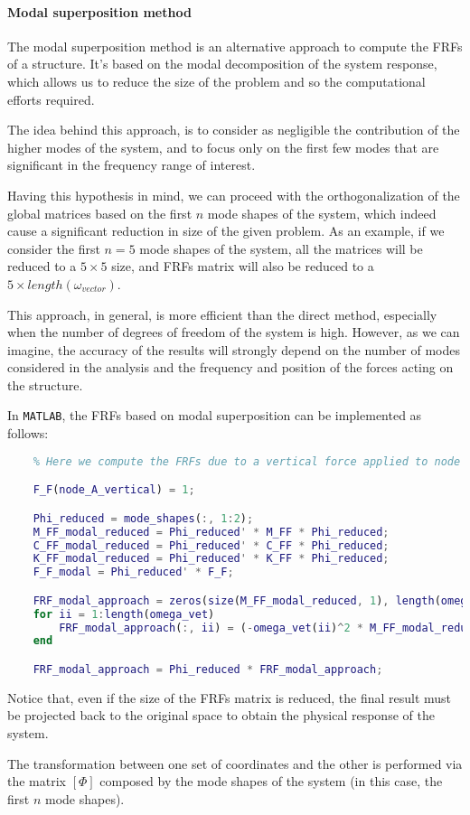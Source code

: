 \paragraph{Modal superposition method}

The modal superposition method is an alternative approach to compute the FRFs of a structure.
It's based on the modal decomposition of the system response, which allows us to reduce the size of the problem and so the computational efforts required.

The idea behind this approach, is to consider as negligible the contribution of the higher modes of the system, and to focus only on the first few modes that are significant in the frequency range of interest.

Having this hypothesis in mind, we can proceed with the orthogonalization of the global matrices based on the first $n$ mode shapes of the system, which indeed cause a significant reduction in size of the given problem.
As an example, if we consider the first $n=5$ mode shapes of the system, all the matrices will be reduced to a $5 \times 5$ size, and FRFs matrix will also be reduced to a $5 \times length(\omega_{vector})$.

This approach, in general, is more efficient than the direct method, especially when the number of degrees of freedom of the system is high.
However, as we can imagine, the accuracy of the results will strongly depend on the number of modes considered in the analysis and the frequency and position of the forces acting on the structure.

In \texttt{MATLAB}, the FRFs based on modal superposition can be implemented as follows:

\begin{lstlisting}[language=Matlab, caption={MATLAB code to compute the FRFs of the structure using the modal superposition method.}]
    % To observe the approximation introduced, we consider only 2 modes
    % Here we compute the FRFs due to a vertical force applied to node A with module 1

    F_F(node_A_vertical) = 1;

    Phi_reduced = mode_shapes(:, 1:2);
    M_FF_modal_reduced = Phi_reduced' * M_FF * Phi_reduced;
    C_FF_modal_reduced = Phi_reduced' * C_FF * Phi_reduced;
    K_FF_modal_reduced = Phi_reduced' * K_FF * Phi_reduced;
    F_F_modal = Phi_reduced' * F_F;

    FRF_modal_approach = zeros(size(M_FF_modal_reduced, 1), length(omega_vet));
    for ii = 1:length(omega_vet)
        FRF_modal_approach(:, ii) = (-omega_vet(ii)^2 * M_FF_modal_reduced + 1i*omega_vet(ii) * C_FF_modal_reduced + K_FF_modal_reduced) \ F_F_modal;
    end

    FRF_modal_approach = Phi_reduced * FRF_modal_approach;
\end{lstlisting}

Notice that, even if the size of the FRFs matrix is reduced, the final result must be projected back to the original space to obtain the physical response of the system.

The transformation between one set of coordinates and the other is performed via the matrix $[\Phi]$ composed by the mode shapes of the system (in this case, the first $n$ mode shapes).
